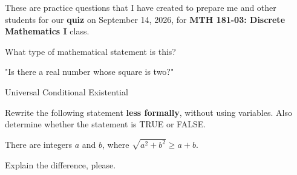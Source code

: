 \documentclass[letterpaper, 12pt]{exam}
\begin{document}
    
    \noindent These are practice questions that I have created to prepare me and other students for our \textbf{quiz} on September 14, 2026, for \textbf{MTH 181-03: Discrete Mathematics I} class.
    
    \vspace{\baselineskip}
    
    \begin{questions}
        \question What type of mathematical statement is this?

        \begin{center}
            "Is there a real number whose square is two?"
        \end{center}
        
            \begin{oneparchoices}
                \choice Universal
                \choice Conditional
                \choice Existential
            \end{oneparchoices}
        \question Rewrite the following statement \textbf{less formally}, without using variables. Also determine whether the statement is TRUE or FALSE.

        \vspace{\baselineskip}
        
        There are integers $a$ and $b$, where $\sqrt{a^2+b^2} \geq a+b$.
        
        \question Explain the difference, please.
\end{questions}
\end{document}
